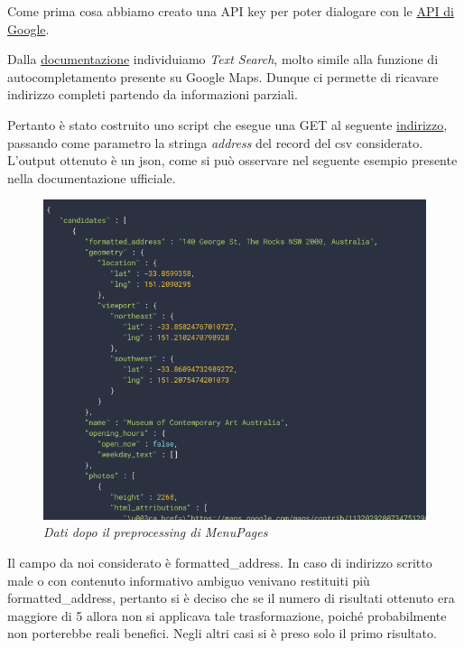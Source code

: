 \documentclass[a4paper,12pt]{article}
\begin{document}
\noindent Come prima cosa abbiamo creato una API key per poter dialogare con le 
\href{https://console.cloud.google.com/google/maps-apis/overview?project=feisty-nectar-281812&folder=&organizationId=}{API di Google}.


\noindent Dalla \href{https://developers.google.com/places/web-service/search}{documentazione} individuiamo \textit{Text Search}, molto simile alla funzione di autocompletamento presente su Google Maps. Dunque ci permette di ricavare indirizzo completi partendo da informazioni parziali.

\noindent Pertanto è stato costruito uno script che esegue una GET al seguente \href{https://maps.googleapis.com/maps/api/place/textsearch/json }{indirizzo}, passando come parametro la stringa \textit{address} del record del csv considerato. L'output ottenuto è un json, come si può osservare nel seguente esempio presente nella documentazione ufficiale.

\begin{figure}[H]
	\centering
	\includegraphics[width=0.8\linewidth]{img/img.png}
	\caption{\textit{Dati dopo il preprocessing di MenuPages}}
\end{figure}

\noindent Il campo da noi considerato è formatted\_address. In caso di indirizzo scritto male o con contenuto informativo ambiguo venivano restituiti più formatted\_address, pertanto si è deciso che se il numero di risultati ottenuto era maggiore di 5 allora non si applicava tale trasformazione, poiché probabilmente non porterebbe reali benefici. Negli altri casi si è preso solo il primo risultato. 
\end{document}
